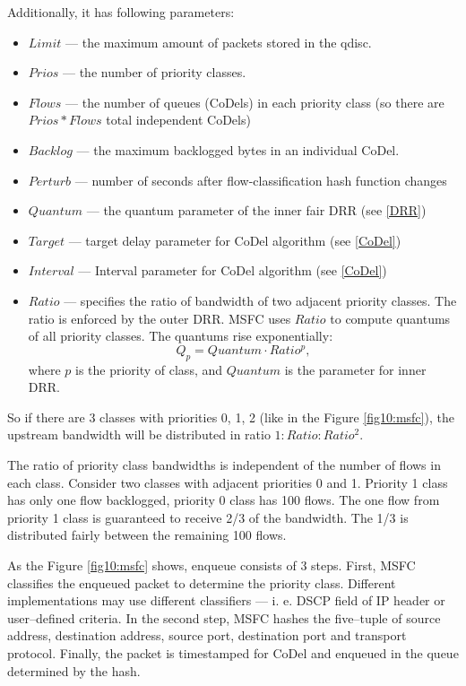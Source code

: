 Additionally,  it has following parameters:
\begin{itemize}
	\item $Limit$ --- the maximum amount of packets stored in the qdisc.
	\item $Prios$ --- the number of priority classes.
	\item $Flows$ --- the number of queues (CoDels) in each priority class (so there are $Prios*Flows$ total independent CoDels)
	\item $Backlog$ --- the maximum backlogged bytes in an individual CoDel.
	\item $Perturb$ --- number of seconds after flow-classification hash function changes
	\item $Quantum$ --- the quantum parameter of the inner fair DRR (see \autoref{DRR})
	\item $Target$ --- target delay parameter for CoDel algorithm (see \autoref{CoDel})
	\item $Interval$ --- Interval parameter for CoDel algorithm (see \autoref{CoDel})
	\item $Ratio$ --- specifies the ratio of bandwidth of two adjacent priority classes. The ratio is enforced by the outer DRR. MSFC uses $Ratio$ to compute quantums of all priority classes. The quantums rise exponentially:
	\[
	Q_p = Quantum \cdot Ratio^p,
	\]
	where $p$ is the priority of class, and $Quantum$ is the parameter for inner DRR.
\end{itemize}
So  if there are 3 classes with priorities 0, 1, 2 (like in the Figure \ref{fig10:msfc}), the upstream bandwidth will be distributed in ratio $1:Ratio:Ratio^2$.

The ratio of priority class bandwidths is independent of the number of flows in each class. Consider two classes with adjacent priorities 0 and 1. Priority 1 class has only one flow backlogged, priority 0 class has 100 flows. The one flow from priority 1 class is guaranteed to receive 2/3 of the bandwidth. The 1/3 is distributed fairly between the remaining 100 flows.

As the Figure \ref{fig10:msfc} shows, enqueue consists of 3 steps. First, MSFC classifies the enqueued packet to determine the priority class. Different implementations may use different classifiers --- i. e. DSCP field of IP header or user--defined criteria. In the second step, MSFC hashes the five--tuple of source address, destination address, source port, destination port and transport protocol. Finally, the packet is timestamped for CoDel and enqueued in the queue determined by the hash.

